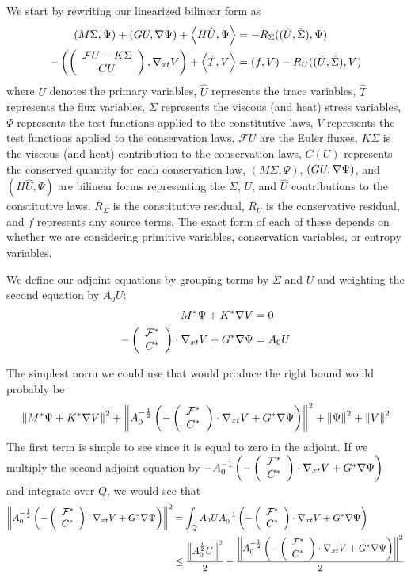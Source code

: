\documentclass{article}
\begin{document}
We start by rewriting our linearized bilinear form as
\begin{align*}
\left( M\Sigma,\Psi \right)+\left( G U,\nabla\Psi \right)+\left\langle H\hat U,\Psi \right\rangle&=-R_\Sigma((\tilde U,\tilde\Sigma),\Psi)\\
-\left( \left( \begin{array}{c} \mathcal{F}U-K\Sigma\\ CU\\ \end{array} \right),\nabla_{xt} V \right)+\left\langle \hat T,V \right\rangle&=\left( f,V \right)-R_U((\tilde U,\tilde\Sigma),V)
\end{align*}
where $U$ denotes the primary variables, $\hat U$ represents the trace variables, $\hat T$ represents the flux variables,
$\Sigma$ represents the viscous (and heat) stress variables,
$\Psi$ represents the test functions applied to the constitutive laws, $V$ represents the test functions applied to the conservation laws,
$\mathcal{F}U$ are the Euler fluxes, $K\Sigma$ is the viscous (and heat) contribution to the conservation laws, $C(U)$ represents the 
conserved quantity for each conservation law, $(M\Sigma,\Psi)$, $(GU,\nabla\Psi)$, and $(H\hat U,\Psi)$ are bilinear forms representing 
the $\Sigma$, $U$, and $\hat U$ contributions to the constitutive laws, $R_\Sigma$ is the constitutive residual, $R_U$ is the conservative residual,
and $f$ represents any source terms.
The exact form of each of these depends on whether we are considering primitive variables, conservation variables, or entropy variables.

We define our adjoint equations by grouping terms by $\Sigma$ and $U$ and weighting the second equation by $A_0U$:
\begin{align*}
M^*\Psi+K^*\nabla V&=0\\
-\left( \begin{array}{c} \mathcal{F^*}\\ C^*\\ \end{array} \right)\cdot\nabla_{xt} V+G^*\nabla\Psi&=A_0U
\end{align*}

The simplest norm we could use that would produce the right bound would probably be
\begin{align*}
\left\| M^*\Psi+K^*\nabla V \right\|^2+\left\| A_0^{-\frac{1}{2}}\left( -\left( \begin{array}{c} \mathcal{F^*}\\ C^*\\ \end{array} \right)\cdot\nabla_{xt} V+G^*\nabla\Psi \right) \right\|^2
+\left\| \Psi \right\|^2+\left\| V \right\|^2
\end{align*}
The first term is simple to see since it is equal to zero in the adjoint.
If we multiply the second adjoint equation by $-A_0^{-1}\left( -\left( \begin{array}{c} \mathcal{F^*}\\ C^*\\ \end{array} \right)\cdot\nabla_{xt} V+G^*\nabla\Psi \right)$
and integrate over $Q$, we would see that 
\begin{align*}
\left\| A_0^{-\frac{1}{2}}\left( -\left( \begin{array}{c} \mathcal{F^*}\\ C^*\\ \end{array} \right)\cdot\nabla_{xt} V+G^*\nabla\Psi \right) \right\|^2
&=\int_QA_0UA_0^{-1}\left( -\left( \begin{array}{c} \mathcal{F^*}\\ C^*\\ \end{array} \right)\cdot\nabla_{xt} V+G^*\nabla\Psi \right)\\
&\leq\frac{\left\| A_0^{\frac{1}{2}}U \right\|^2}{2}+\frac{\left\| A_0^{-\frac{1}{2}}\left( -\left( \begin{array}{c} \mathcal{F^*}\\ C^*\\ \end{array} \right)\cdot\nabla_{xt} V+G^*\nabla\Psi \right) \right\|^2}{2}\\
\end{align*}
\end{document}
